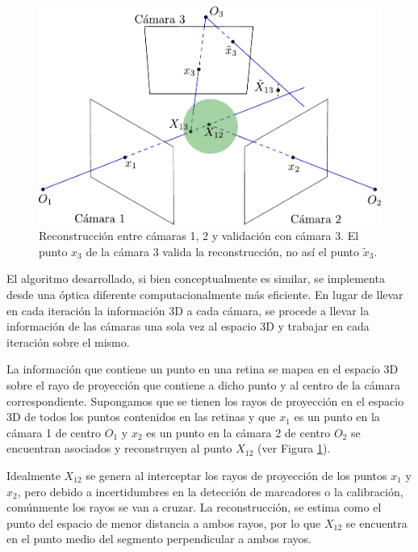\begin{figure}[ht!]
\centering
\hspace{-1cm}
\captionsetup{justification=centering,margin=1.0cm}
\includegraphics[scale=0.7]{img/Reconstruccion/validacion.pdf}
\caption{Reconstrucción entre cámaras 1, 2 y validación con cámara 3. El punto $x_3$ de la cámara 3 valida la reconstrucción, no así el punto $\tilde{x}_3$.}
\label{img_reconstruccion_validacion}
\end{figure}


El algoritmo desarrollado, si bien conceptualmente es similar, se implementa desde una óptica diferente computacionalmente más eficiente.
En lugar de llevar en cada iteración la información 3D a cada cámara, se procede a llevar la información de las cámaras una sola vez al espacio 3D y trabajar en cada iteración sobre el mismo. 


La información que contiene un punto en una retina se mapea en el espacio 3D sobre el rayo de proyección que contiene a dicho punto y al centro de la cámara correspondiente. Supongamos que se tienen los rayos de proyección en el espacio 3D de todos los puntos contenidos en las retinas y que $x_1$ es un punto en la cámara 1 de centro $O_1$ y $x_2$ es un punto en la cámara 2 de centro $O_2$ se encuentran asociados y reconstruyen al punto $X_{12}$ (ver Figura \ref{img_reconstruccion_validacion}). 


Idealmente $X_{12}$ se genera al interceptar los rayos de proyección de los puntos $x_1$ y $x_2$, pero debido a incertidumbres en la detección de marcadores o la calibración, comúnmente los rayos se van a cruzar. La reconstrucción, se estima como el punto del espacio de menor distancia a ambos rayos, por lo que
$X_{12}$ se encuentra en el punto medio del segmento perpendicular a ambos rayos.



